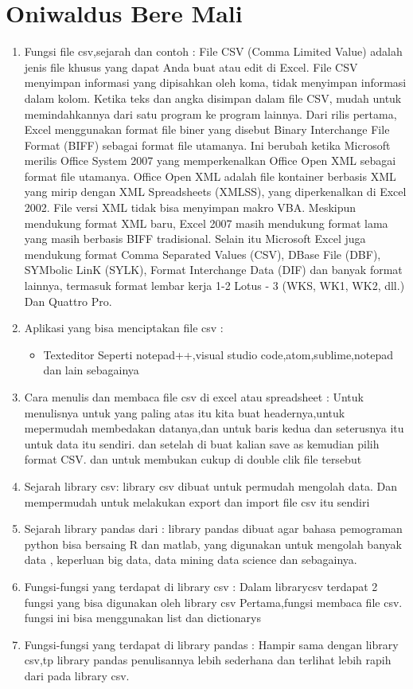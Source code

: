 \section{Oniwaldus Bere Mali}
\begin{enumerate}
\item Fungsi file csv,sejarah dan contoh :
File CSV (Comma Limited Value) adalah jenis file khusus yang dapat Anda buat atau edit di Excel. File CSV menyimpan informasi yang dipisahkan oleh koma, tidak menyimpan informasi dalam kolom. Ketika teks dan angka disimpan dalam file CSV, mudah untuk memindahkannya dari satu program ke program lainnya.
Dari rilis pertama, Excel menggunakan format file biner yang disebut Binary Interchange File Format (BIFF) sebagai format file utamanya. Ini berubah ketika Microsoft merilis Office System 2007 yang memperkenalkan Office Open XML sebagai format file utamanya. Office Open XML adalah file kontainer berbasis XML yang mirip dengan XML Spreadsheets (XMLSS), yang diperkenalkan di Excel 2002. File versi XML tidak bisa menyimpan makro VBA.
Meskipun mendukung format XML baru, Excel 2007 masih mendukung format lama yang masih berbasis BIFF tradisional. Selain itu Microsoft Excel juga mendukung format Comma Separated Values (CSV), DBase File (DBF), SYMbolic LinK (SYLK), Format Interchange Data (DIF) dan banyak format lainnya, termasuk format lembar kerja 1-2 Lotus - 3 (WKS, WK1, WK2, dll.) Dan Quattro Pro.
\item Aplikasi yang bisa menciptakan file csv :
\begin{itemize}
\item Texteditor
Seperti notepad++,visual studio code,atom,sublime,notepad dan lain sebagainya
\end{itemize}
\item Cara menulis dan membaca file csv di excel atau spreadsheet :
Untuk menulisnya untuk yang paling atas itu kita buat headernya,untuk mepermudah membedakan datanya,dan untuk baris kedua dan seterusnya itu untuk data itu sendiri.
dan setelah di buat kalian save as kemudian pilih format CSV.
dan untuk membukan cukup di double clik file tersebut
\item Sejarah library csv:
library csv dibuat untuk permudah mengolah data. Dan mempermudah untuk melakukan export dan import file csv itu sendiri
\item Sejarah library pandas dari :
library pandas dibuat agar bahasa pemograman python bisa bersaing R dan matlab, yang digunakan untuk mengolah banyak data , keperluan big data, data mining data science dan sebagainya.
\item Fungsi-fungsi yang terdapat di library csv :
Dalam librarycsv terdapat 2 fungsi yang bisa digunakan oleh library csv
Pertama,fungsi membaca file csv.
fungsi ini bisa menggunakan list dan dictionarys
\item Fungsi-fungsi yang terdapat di library pandas :
Hampir sama dengan library csv,tp library pandas penulisannya lebih sederhana dan terlihat lebih rapih dari pada library csv.
\end{enumerate}
